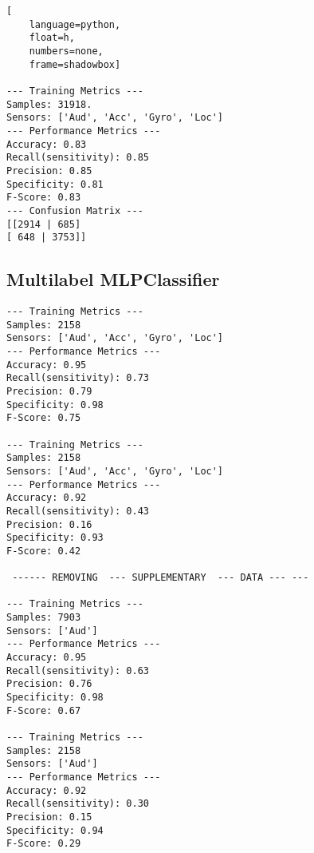 \documentclass{UoNMCHA}
\numberwithin{equation}{section}
\begin{document}
\begin{lstlisting}[
    language=python,
    float=h,
    numbers=none,
    frame=shadowbox]

--- Training Metrics ---
Samples: 31918.
Sensors: ['Aud', 'Acc', 'Gyro', 'Loc']
--- Performance Metrics ---
Accuracy: 0.83
Recall(sensitivity): 0.85
Precision: 0.85
Specificity: 0.81
F-Score: 0.83
--- Confusion Matrix ---
[[2914 | 685]
[ 648 | 3753]]
\end{lstlisting}


\subsection{Multilabel MLPClassifier}

\begin{lstlisting}
--- Training Metrics ---
Samples: 2158
Sensors: ['Aud', 'Acc', 'Gyro', 'Loc']
--- Performance Metrics ---
Accuracy: 0.95
Recall(sensitivity): 0.73
Precision: 0.79
Specificity: 0.98
F-Score: 0.75

--- Training Metrics ---
Samples: 2158
Sensors: ['Aud', 'Acc', 'Gyro', 'Loc']
--- Performance Metrics ---
Accuracy: 0.92
Recall(sensitivity): 0.43
Precision: 0.16
Specificity: 0.93
F-Score: 0.42

 ------ REMOVING  --- SUPPLEMENTARY  --- DATA --- ---

--- Training Metrics ---
Samples: 7903
Sensors: ['Aud']
--- Performance Metrics ---
Accuracy: 0.95
Recall(sensitivity): 0.63
Precision: 0.76
Specificity: 0.98
F-Score: 0.67

--- Training Metrics ---
Samples: 2158
Sensors: ['Aud']
--- Performance Metrics ---
Accuracy: 0.92
Recall(sensitivity): 0.30
Precision: 0.15
Specificity: 0.94
F-Score: 0.29

\end{lstlisting}
\end{document}
